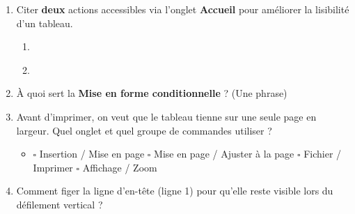 \documentclass[11pt]{article}
\begin{document}
\begin{exercice}
\begin{enumerate}
    \item Citer \textbf{deux} actions accessibles via l'onglet \textbf{Accueil} pour améliorer la lisibilité d'un tableau.
    \begin{enumerate}
        \item \underline{\hspace{5cm}}
        \item \underline{\hspace{5cm}}
    \end{enumerate}
    \item À quoi sert la \textbf{Mise en forme conditionnelle} ? (Une phrase)
    \underline{\hspace{8cm}}
    \item Avant d'imprimer, on veut que le tableau tienne sur une seule page en largeur. Quel onglet et quel groupe de commandes utiliser ?
    \begin{itemize}
        \item $\square$ Insertion / Mise en page \quad $\square$ Mise en page / Ajuster à la page \quad $\square$ Fichier / Imprimer \quad $\square$ Affichage / Zoom
    \end{itemize}
    \item Comment figer la ligne d'en-tête (ligne 1) pour qu'elle reste visible lors du défilement vertical ?
    \underline{\hspace{8cm}}
\end{enumerate}
\end{exercice}
\end{document}
